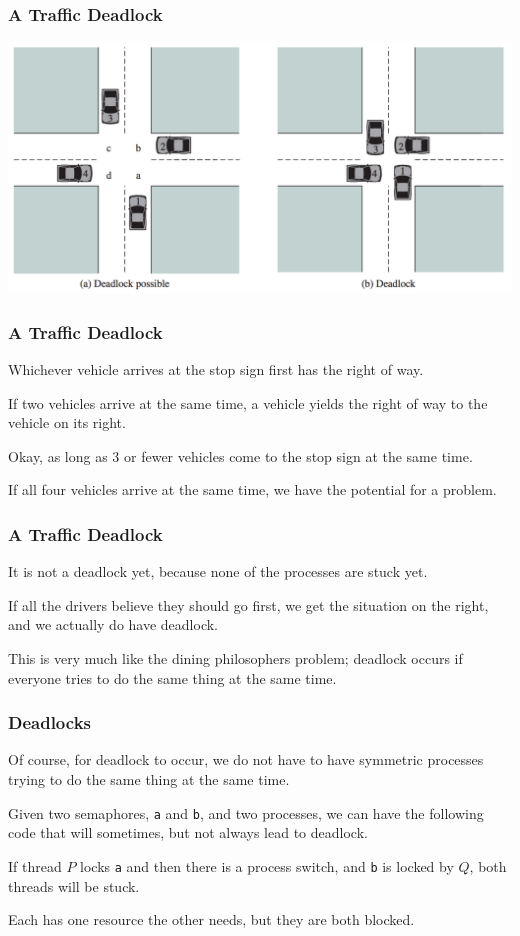 \begin{frame}
\frametitle{A Traffic Deadlock}

\begin{center}
\includegraphics[width=\textwidth]{images/car-deadlock.png}
\end{center}


\end{frame}

\begin{frame}
\frametitle{A Traffic Deadlock}

Whichever vehicle arrives at the stop sign first has the right of way. 

If two vehicles arrive at the same time, a vehicle yields the right of way to the vehicle on its right.

Okay, as long as 3 or fewer vehicles come to the stop sign at the same time.

 If all four vehicles arrive at the same time, we have the potential for a problem. 
\end{frame}

\begin{frame}
\frametitle{A Traffic Deadlock}

It is not a deadlock yet, because none of the processes are stuck yet.

If all the drivers believe they should go first, we get the situation on the right, and we actually do have deadlock. 

This is very much like the dining philosophers problem; deadlock occurs if everyone tries to do the same thing at the same time.

\end{frame}

\begin{frame}
\frametitle{Deadlocks}

Of course, for deadlock to occur, we do not have to have symmetric processes trying to do the same thing at the same time. 

Given two semaphores, \texttt{a} and \texttt{b}, and two processes, we can have the following code that will sometimes, but not always lead to deadlock. 

If thread $P$ locks \texttt{a} and then there is a process switch, and \texttt{b} is locked by $Q$, both threads will be stuck. 

Each has one resource the other needs, but they are both blocked.


\end{frame}

